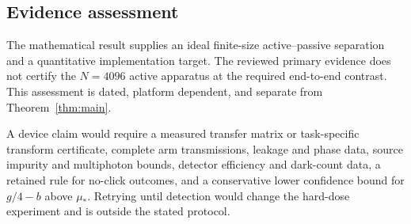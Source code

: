 \subsection{Evidence assessment}

The mathematical result supplies an ideal finite-size active--passive separation and a quantitative implementation target. The reviewed primary evidence does not certify the $N=4096$ active apparatus at the required end-to-end contrast. This assessment is dated, platform dependent, and separate from Theorem~\ref{thm:main}.

A device claim would require a measured transfer matrix or task-specific transform certificate, complete arm transmissions, leakage and phase data, source impurity and multiphoton bounds, detector efficiency and dark-count data, a retained rule for no-click outcomes, and a conservative lower confidence bound for $g/4-b$ above $\mu_*$. Retrying until detection would change the hard-dose experiment and is outside the stated protocol.
